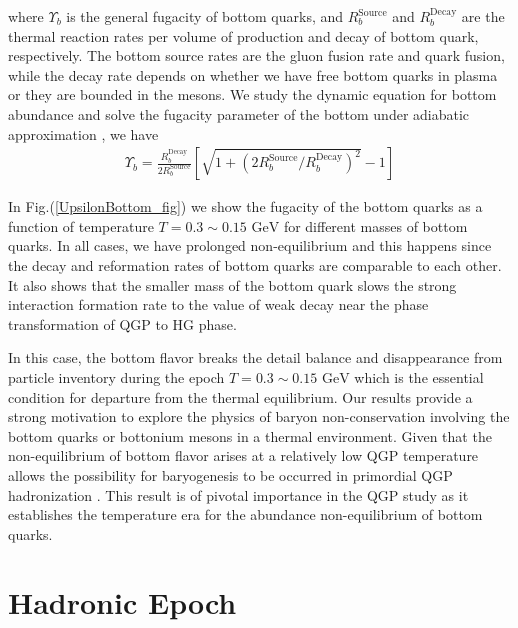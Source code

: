 \documentclass[universe,article,submit,moreauthors,pdftex,a4paper]{Definitions/mdpi}
\newcommand{\GeV}{\text{ GeV}}
\begin{document}
where $\Upsilon_b$ is the general fugacity of bottom quarks, and $R^{\mathrm{Source}}_{b}$ and $R^{\mathrm{Decay}}_{b}$ are the thermal reaction rates per volume of production and decay of bottom quark, respectively. The bottom source rates are the gluon fusion rate and quark fusion, while the decay rate depends on whether we have free bottom quarks in plasma or they are bounded in the mesons. We study the dynamic equation for bottom abundance and solve the fugacity parameter of the bottom under adiabatic approximation \cite{Yang:2020nne,Yang:2023bot}, we have
\begin{align}
\Upsilon_{b}=\frac{R^{\mathrm{Decay}}_{b}}{2R^{\mathrm{Source}}_{b}}\left[\sqrt{1+\left(2R^{\mathrm{Source}}_{b}/R^{\mathrm{Decay}}_{b}\right)^2}-1\right]
\end{align}

In Fig.(\ref{UpsilonBottom_fig}) we show the fugacity of the bottom quarks as a function of temperature $T=0.3\sim0.15\GeV$ for different masses of bottom quarks. In all cases, we have prolonged non-equilibrium and this happens since the decay and reformation rates of bottom quarks are comparable to each other. It also shows that  the smaller mass of the bottom quark slows the strong interaction formation rate to the value of weak decay near the phase transformation of QGP to HG phase.

In this case, the bottom flavor breaks the detail balance and disappearance from particle inventory during the epoch $T = 0.3 \sim0.15\GeV$ which is the essential condition for departure from the thermal equilibrium. Our results provide a strong motivation to explore the physics of baryon non-conservation involving the bottom quarks or bottonium mesons in a thermal environment. Given that the non-equilibrium of bottom flavor arises at a relatively low QGP temperature allows the possibility for baryogenesis to be occurred in primordial QGP hadronization \cite{Yang:2020nne,Yang:2023bot}. This result is of pivotal importance in the QGP study as it establishes the temperature era for the abundance non-equilibrium of bottom quarks.

\section{Hadronic Epoch}\label{sec:Hadrons}
\end{document}
